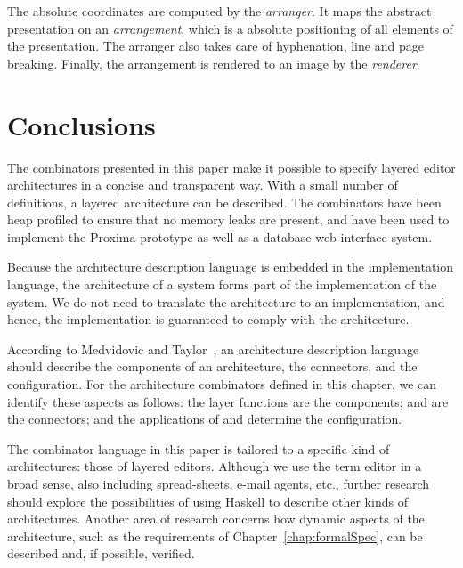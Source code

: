 The absolute coordinates are computed by the {\em arranger}. It maps the abstract presentation on an {\em arrangement}, which is a absolute positioning of all elements of the presentation. The arranger also takes care of hyphenation, line and page breaking. Finally, the arrangement is rendered to an image by the {\em renderer}.
\ec


%																
%																
%																
\section{Conclusions} \label{sect:haskellconclusions}

The combinators presented in this paper make it possible to specify layered editor architectures in a concise and transparent way. With a small number of definitions, a layered architecture can be described. The combinators have been heap profiled to ensure that no memory leaks are present, and have been used to implement the Proxima prototype as well as a database web-interface system.

Because the architecture description language is embedded in the implementation language, the architecture of a system forms part of the implementation of the system. We do not need to translate the architecture to an implementation, and hence, the implementation is guaranteed to comply with the architecture.

According to Medvidovic and Taylor~\cite{medvidovic00ADLs}, an architecture description language should describe the components of an architecture, the connectors, and the configuration. For the architecture combinators defined in this chapter, we can identify these aspects as follows: the layer functions are the components;  and  are the connectors; and the applications of  and  determine the configuration.

The combinator language in this paper is tailored to a specific kind of architectures: those of layered editors. Although we use the term editor in a broad sense, also including spread-sheets, e-mail agents, etc., further research should explore the possibilities of using Haskell to describe other kinds of architectures. Another area of research concerns how dynamic aspects of the architecture, such as the requirements of Chapter~\ref{chap:formalSpec}, can be described and, if possible, verified.

